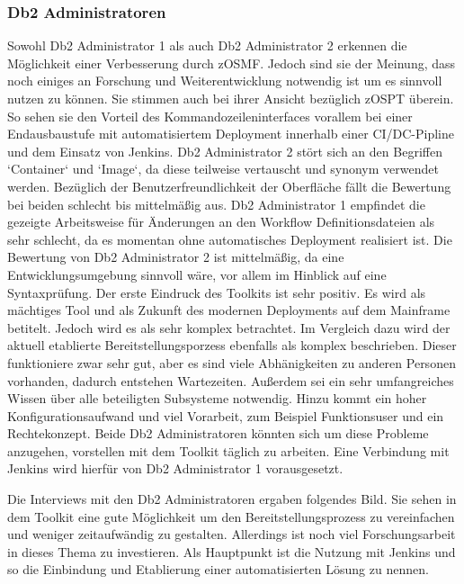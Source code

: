 \subsubsection{Db2 Administratoren}
Sowohl Db2 Administrator 1 als auch Db2 Administrator 2 erkennen die Möglichkeit einer Verbesserung durch zOSMF.
Jedoch sind sie der Meinung, dass noch einiges an Forschung und Weiterentwicklung notwendig ist um es sinnvoll nutzen zu können.
Sie stimmen auch bei ihrer Ansicht bezüglich zOSPT überein.
So sehen sie den Vorteil des Kommandozeileninterfaces vorallem bei einer Endausbaustufe mit automatisiertem Deployment innerhalb einer CI/DC-Pipline und dem Einsatz von Jenkins.
Db2 Administrator 2 stört sich an den Begriffen `Container` und `Image`, da diese teilweise vertauscht und synonym verwendet werden.
Bezüglich der Benutzerfreundlichkeit der Oberfläche fällt die Bewertung bei beiden schlecht bis mittelmäßig aus.
Db2 Administrator 1 empfindet die gezeigte Arbeitsweise für Änderungen an den Workflow Definitionsdateien als sehr schlecht, da es momentan ohne automatisches Deployment realisiert ist.
Die Bewertung von Db2 Administrator 2 ist mittelmäßig, da eine Entwicklungsumgebung sinnvoll wäre, vor allem im Hinblick auf eine Syntaxprüfung.
Der erste Eindruck des Toolkits ist sehr positiv.
Es wird als mächtiges Tool und als Zukunft des modernen Deployments auf dem Mainframe betitelt.
Jedoch wird es als sehr komplex betrachtet.
Im Vergleich dazu wird der aktuell etablierte Bereitstellungsporzess ebenfalls als komplex beschrieben.
Dieser funktioniere zwar sehr gut, aber es sind viele Abhänigkeiten zu anderen Personen vorhanden, dadurch entstehen Wartezeiten.
Außerdem sei ein sehr umfangreiches Wissen über alle beteiligten Subsysteme notwendig.
Hinzu kommt ein hoher Konfigurationsaufwand und viel Vorarbeit, zum Beispiel Funktionsuser und ein Rechtekonzept.
Beide Db2 Administratoren könnten sich um diese Probleme anzugehen, vorstellen mit dem Toolkit täglich zu arbeiten.
Eine Verbindung mit Jenkins wird hierfür von Db2 Administrator 1 vorausgesetzt.

Die Interviews mit den Db2 Administratoren ergaben folgendes Bild.
Sie sehen in dem Toolkit eine gute Möglichkeit um den Bereitstellungsprozess zu vereinfachen und weniger zeitaufwändig zu gestalten.
Allerdings ist noch viel Forschungsarbeit in dieses Thema zu investieren.
Als Hauptpunkt ist die Nutzung mit Jenkins und so die Einbindung und Etablierung einer automatisierten Lösung zu nennen.

